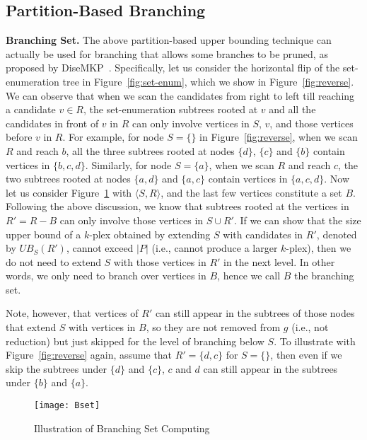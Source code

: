 \documentclass[sigconf, nonacm]{acmart}
\begin{document}
\subsection{Partition-Based Branching}\label{ssec:pub2}
{\bf Branching Set.}  The above partition-based upper bounding technique can actually be used for branching that allows some branches to be pruned, as proposed by DiseMKP~\cite{DiseMKP}. Specifically, let us consider the horizontal flip of the set-enumeration tree in Figure~\ref{fig:set-enum}, which we show in Figure~\ref{fig:reverse}. We can observe that when we scan the candidates from right to left till reaching a candidate $v\in R$, the set-enumeration subtrees rooted at $v$ and all the candidates in front of $v$ in $R$ can only involve vertices in $S$, $v$, and those vertices before $v$ in $R$. For example, for node $S=\{\}$ in Figure~\ref{fig:reverse}, when we scan $R$ and reach $b$, all the three subtrees rooted at nodes $\{d\}$, $\{c\}$ and $\{b\}$ contain vertices in $\{b,c,d\}$. Similarly, for node $S=\{a\}$, when we scan $R$ and reach $c$, the two subtrees rooted at nodes $\{a, d\}$ and $\{a, c\}$ contain vertices in $\{a,c,d\}$. 
%
Now let us consider Figure~\ref{fig:Bset} with $\langle S,R\rangle$, and the last few vertices constitute a set $B$. Following the above discussion, we know that subtrees rooted at the vertices in $R'=R-B$ can only involve those vertices in $S\cup R'$. If we can show that the size upper bound of a $k$-plex obtained by extending $S$ with candidates in $R'$, denoted by $UB_S(R')$, cannot exceed $|P|$ (i.e., cannot produce a larger $k$-plex), then we do not need to extend $S$ with those vertices in $R'$ in the next level. In other words, we only need to branch over vertices in $B$, hence we call $B$ the branching set.

Note, however, that vertices of $R'$ can still appear in the subtrees of those nodes that extend $S$ with vertices in $B$, so they are not removed from $g$ (i.e., not reduction) but just skipped for the level of branching below $S$. To illustrate with Figure~\ref{fig:reverse} again, assume that $R'=\{d, c\}$ for $S=\{\}$, then even if we skip the subtrees under $\{d\}$ and $\{c\}$, $c$ and $d$ can still appear in the subtrees under $\{b\}$ and $\{a\}$.

\begin{figure}[t]
  \texttt{[image: Bset]}
  \vspace{-6mm}
  \caption{Illustration of Branching Set Computing}\label{fig:Bset}
\end{figure}
\end{document}
